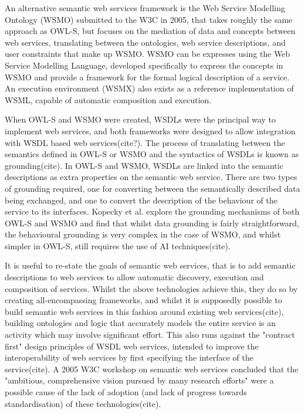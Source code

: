 An alternative semantic web services framework is the Web Service Modelling
Ontology (WSMO) submitted to the W3C in 2005, that takes roughly the same
approach as OWL-S, but focuses on the mediation of data and concepts between
web services, translating between the ontologies, web service descriptions, and
user constraints that make up WSMO. WSMO can be expresses using the Web Service
Modelling Language, developed specifically to express the concepts in WSMO and
provide a framework for the formal logical description of a service. An
execution environment (WSMX) also exists as a reference implementation of WSML,
capable of automatic composition and execution.

When OWL-S and WSMO were created, WSDLs were the principal way to implement web
services, and both frameworks were designed to allow integration with WSDL based
web services(cite?). The process of translating between the semantics defined
in OWL-S or WSMO and the syntactics of WSDLs is known as grounding(cite). In
OWL-S and WSMO, WSDLs are linked into the semantic descriptions as extra
properties on the semantic web service. There are two types of grounding
required, one for converting between the semantically described data being
exchanged, and one to convert the description of the behaviour of the service to
its interfaces. Kopecky et al. explore the grounding mechanisms of both OWL-S
and WSMO and find that whilst data grounding is fairly straightforward, the
behavioural grounding is very complex in the case of WSMO, and whilst simpler in
OWL-S, still requires the use of AI techniques(cite).

It is useful to re-state the goals of semantic web services, that is to add
semantic descriptions to web services to allow automatic discovery, execution
and composition of services. Whilst the above technologies achieve this, they do
so by creating all-encompassing frameworks, and whilst it is supposedly
possible to build semantic web services in this fashion around existing web
services(cite), building ontologies and logic that accurately models the entire
service is an activity which may involve significant effort. This also runs
against the "contract first" design principles of WSDL web services, intended to
improve the interoperability of web services by first specifying the interface
of the service(cite). A 2005 W3C workshop on semantic web services concluded that the
"ambitious, comprehensive vision pursued by many research efforts" were a
possible cause of the lack of adoption (and lack of progress towards
standardisation) of these technologies(cite). 

